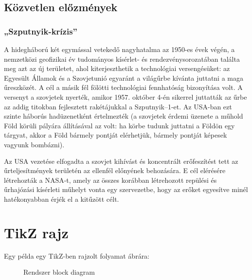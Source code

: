 \subsection{Közvetlen előzmények}

\subsubsection{„Szputnyik-krízis”}

A hidegháború két egymással vetekedő nagyhatalma az 1950-es évek végén, a nemzetközi geofizikai év tudományos kísérlet- és rendezvénysorozatában találta meg azt az új területet, ahol kiterjeszthetik a technológiai versengésüket: az Egyesült Államok és a Szovjetunió egyaránt a világűrbe kívánta juttatni a maga űreszközét. A cél a másik fél fölötti technológiai fennhatóság bizonyítása volt. A versenyt a szovjetek nyerték, amikor 1957. október 4-én sikerrel juttatták az űrbe az addig titokban fejlesztett rakétájukkal a Szputnyik–1-et. Az USA-ban ezt szinte háborús hadüzenetként értelmezték (a szovjetek érdemi üzenete a műhold Föld körüli pályára állításával az volt: ha körbe tudunk juttatni a Földön egy tárgyat, akkor a Föld bármely pontját elérhetjük, bármely pontját képesek vagyunk bombázni).

Az USA vezetése elfogadta a szovjet kihívást és koncentrált erőfeszítést tett az űrteljesítmények területén az ellenfél előnyének behozására. E cél elérésére létrehozták a NASA-t, amely az összes korábban létrehozott repülési és űrhajózási kísérleti műhelyt vonta egy szervezetbe, hogy az erőket egyesítve minél hatékonyabban érjék el a kitűzött célt. 

\section{TikZ rajz}

Egy példa egy TikZ-ben rajzolt folyamat ábrára:

\begin{figure}[H]
	\centering
	\caption{Rendszer block diagram}
	\label{fig:system}
\end{figure}

